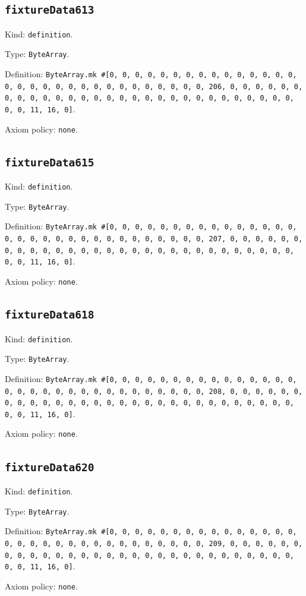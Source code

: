 \documentclass[11pt]{article}
\begin{document}
\subsection*{\texttt{fixtureData613}}
\noindent Kind: \texttt{definition}.\par
\noindent Type: \texttt{ByteArray}.\par
\noindent Definition: \texttt{ByteArray.mk \#[0, 0, 0, 0, 0, 0, 0, 0, 0, 0, 0, 0, 0, 0, 0, 0, 0, 0, 0, 0, 0, 0, 0, 0, 0, 0, 0, 0, 0, 0, 0, 206, 0, 0, 0, 0, 0, 0, 0, 0, 0, 0, 0, 0, 0, 0, 0, 0, 0, 0, 0, 0, 0, 0, 0, 0, 0, 0, 0, 0, 0, 0, 0, 11, 16, 0]}.\par
\noindent Axiom policy: \texttt{none}.\par
\subsection*{\texttt{fixtureData615}}
\noindent Kind: \texttt{definition}.\par
\noindent Type: \texttt{ByteArray}.\par
\noindent Definition: \texttt{ByteArray.mk \#[0, 0, 0, 0, 0, 0, 0, 0, 0, 0, 0, 0, 0, 0, 0, 0, 0, 0, 0, 0, 0, 0, 0, 0, 0, 0, 0, 0, 0, 0, 0, 207, 0, 0, 0, 0, 0, 0, 0, 0, 0, 0, 0, 0, 0, 0, 0, 0, 0, 0, 0, 0, 0, 0, 0, 0, 0, 0, 0, 0, 0, 0, 0, 11, 16, 0]}.\par
\noindent Axiom policy: \texttt{none}.\par
\subsection*{\texttt{fixtureData618}}
\noindent Kind: \texttt{definition}.\par
\noindent Type: \texttt{ByteArray}.\par
\noindent Definition: \texttt{ByteArray.mk \#[0, 0, 0, 0, 0, 0, 0, 0, 0, 0, 0, 0, 0, 0, 0, 0, 0, 0, 0, 0, 0, 0, 0, 0, 0, 0, 0, 0, 0, 0, 0, 208, 0, 0, 0, 0, 0, 0, 0, 0, 0, 0, 0, 0, 0, 0, 0, 0, 0, 0, 0, 0, 0, 0, 0, 0, 0, 0, 0, 0, 0, 0, 0, 11, 16, 0]}.\par
\noindent Axiom policy: \texttt{none}.\par
\subsection*{\texttt{fixtureData620}}
\noindent Kind: \texttt{definition}.\par
\noindent Type: \texttt{ByteArray}.\par
\noindent Definition: \texttt{ByteArray.mk \#[0, 0, 0, 0, 0, 0, 0, 0, 0, 0, 0, 0, 0, 0, 0, 0, 0, 0, 0, 0, 0, 0, 0, 0, 0, 0, 0, 0, 0, 0, 0, 209, 0, 0, 0, 0, 0, 0, 0, 0, 0, 0, 0, 0, 0, 0, 0, 0, 0, 0, 0, 0, 0, 0, 0, 0, 0, 0, 0, 0, 0, 0, 0, 11, 16, 0]}.\par
\noindent Axiom policy: \texttt{none}.\par
\end{document}
